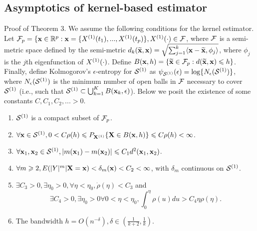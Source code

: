 \documentclass[useAMS,usenatbib,referee]{biom}
\def\Fsc{{\cal F}}
\begin{document}
\subsection{Asymptotics of kernel-based estimator}
Proof of Theorem 3. We assume the following conditions for the kernel estimator. Let $\Fsc_p = \{\bx \in \Rbb^p : \bx = \{X\sone(t_1), ..., X\sone(t_p)\}, X\sone(\cdot) \in \Fsc$, where $\Fsc$ is a semi-metric space defined by the semi-metric $d_k({\widetilde {{\bf x}}}, {\bf x}) = \sqrt{\sum_{j=1}^k \langle {\bf x} - {\widetilde {{\bf x}}}, \phi_j\rangle}$, where $\phi_j$ is the $j$th eigenfunction of $X^{(1)}(\cdot)$. Define $B(\bx, h) = \{\bxtilde \in \Fsc_p : d(\bxtilde, \bx) \leq h\}$. Finally, define Kolmogorov's $\epsilon$-entropy for $\suppxo$ as $\psi_{\suppxo}(\epsilon) = \log\{N_\epsilon(\suppxo)\}$, where $N_\epsilon(\suppxo)$ is the minimum number of open balls in $\Fsc$ necessary to cover $\suppxo$ (i.e., such that $\suppxo \subset \bigcup_{k=1}^K B(\bx_k, \epsilon)$). Below we posit the existence of some constants $C, C_1, C_2, ... > 0$.
\begin{enumerate}
    \item $\suppxo$ is a compact subset of $\Fsc_p$.
    \item $\forall \bx \in \suppxo, 0 < C\rho(h) \leq P\subxo\{\bX \in B(\bx, h)\} \leq C\rho(h) < \infty$. %
    \item $\forall \bx_1, \bx_2 \in \suppxo, |m(\bx_1) - m(\bx_2)| \leq C_1 d^2(\bx_1, \bx_2)$.
    \item $\forall m \geqslant 2, E(|Y|^m | {\bf X} = {\bf x}) < \delta_m({\bf x}) < C_2 < \infty$, with $\delta_m$ continuous on $\suppxo$.
    \item $\exists C_3 > 0, \exists\eta_0 > 0, \forall \eta < \eta_0, \dot{\rho}(\eta) < C_3$ and 
    \[
       \exists C_4 > 0, \exists \eta_0 > 0 \forall 0 < \eta < \eta_0, \int_0^\eta \rho(u)du > C_4 \eta \rho(\eta).
    \] %
    \item The bandwidth $h = O(n^{-\delta}), \delta \in \left(\frac{1}{k+2}, \frac{1}{k}\right)$. 
\end{enumerate}
\end{document}
